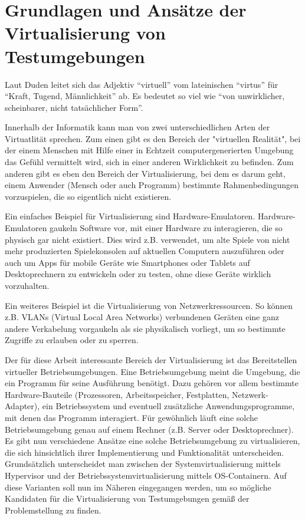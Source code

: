 \section{Grundlagen und Ansätze der Virtualisierung von Testumgebungen}

Laut Duden leitet sich das Adjektiv "`virtuell"' vom lateinischen "`virtus"' für "`Kraft, Tugend, Männlichkeit"' ab. Es bedeutet so viel wie "`von unwirklicher, scheinbarer, nicht tatsächlicher Form"'.

Innerhalb der Informatik kann man von zwei unterschiedlichen Arten der Virtuatlität sprechen. Zum einen gibt es den Bereich der "virtuellen Realität", bei der einem Menschen mit Hilfe einer in Echtzeit computergenerierten Umgebung das Gefühl vermittelt wird, sich in einer anderen Wirklichkeit zu befinden. Zum anderen gibt es eben den Bereich der Virtualisierung, bei dem es darum geht, einem Anwender (Mensch oder auch Programm) bestimmte Rahmenbedingungen vorzuspielen, die so eigentlich nicht existieren.

Ein einfaches Beispiel für Virtualisierung sind Hardware-Emulatoren. Hardware-Emulatoren gaukeln Software vor, mit einer Hardware zu interagieren, die so physisch gar nicht existiert. Dies wird z.B. verwendet, um alte Spiele von nicht mehr produzierten Spielekonsolen auf aktuellen Computern auszuführen oder auch um Apps für mobile Geräte wie Smartphones oder Tablets auf Desktoprechnern zu entwickeln oder zu testen, ohne diese Geräte wirklich vorzuhalten.

Ein weiteres Beispiel ist die Virtualisierung von Netzwerkressourcen. So können z.B. VLANs (Virtual Local Area Networks) verbundenen Geräten eine ganz andere Verkabelung vorgaukeln als sie physikalisch vorliegt, um so bestimmte Zugriffe zu erlauben oder zu sperren.

Der für diese Arbeit interessante Bereich der Virtualisierung ist das Bereitstellen virtueller Betriebsumgebungen. Eine Betriebsumgebung meint die Umgebung, die ein Programm für seine Ausführung benötigt. Dazu gehören vor allem bestimmte Hardware-Bauteile (Prozessoren, Arbeitsspeicher, Festplatten, Netzwerk-Adapter), ein Betriebssystem und eventuell zusätzliche Anwendungsprogramme, mit denen das Programm interagiert. Für gewöhnlich läuft eine solche Betriebsumgebung genau auf einem Rechner (z.B. Server oder Desktoprechner). Es gibt nun verschiedene Ansätze eine solche Betriebsumgebung zu virtualisieren, die sich hinsichtlich ihrer Implementierung und Funktionalität unterscheiden. Grundsätzlich unterscheidet man zwischen der Systemvirtualisierung mittels Hypervisor und der Betriebssystemvirtualisierung mittels OS-Containern. Auf diese Varianten soll nun im Näheren eingegangen werden, um so mögliche Kandidaten für die Virtualisierung von Testumgebungen gemäß der Problemstellung zu finden.

